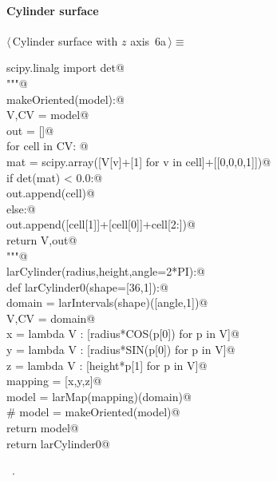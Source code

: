 \documentclass[11pt,oneside]{article}	%
\begin{document}
\paragraph{Cylinder surface}
\begin{flushleft} \small \label{scrap9}
\protect{}$\langle\,$Cylinder surface with $z$ axis\nobreak\ {\footnotesize 6a}$\,\rangle\equiv$
\vspace{-1ex}
\begin{list}{}{} \item
\mbox{}\verb@from scipy.linalg import det@\\
\mbox{}\verb@"""@\\
\mbox{}\verb@def makeOriented(model):@\\
\mbox{}\verb@   V,CV = model@\\
\mbox{}\verb@   out = []@\\
\mbox{}\verb@   for cell in CV: @\\
\mbox{}\verb@      mat = scipy.array([V[v]+[1] for v in cell]+[[0,0,0,1]])@\\
\mbox{}\verb@      if det(mat) < 0.0:@\\
\mbox{}\verb@         out.append(cell)@\\
\mbox{}\verb@      else:@\\
\mbox{}\verb@         out.append([cell[1]]+[cell[0]]+cell[2:])@\\
\mbox{}\verb@   return V,out@\\
\mbox{}\verb@"""@\\
\mbox{}\verb@def larCylinder(radius,height,angle=2*PI):@\\
\mbox{}\verb@   def larCylinder0(shape=[36,1]):@\\
\mbox{}\verb@      domain = larIntervals(shape)([angle,1])@\\
\mbox{}\verb@      V,CV = domain@\\
\mbox{}\verb@      x = lambda V : [radius*COS(p[0]) for p in V]@\\
\mbox{}\verb@      y = lambda V : [radius*SIN(p[0]) for p in V]@\\
\mbox{}\verb@      z = lambda V : [height*p[1] for p in V]@\\
\mbox{}\verb@      mapping = [x,y,z]@\\
\mbox{}\verb@      model = larMap(mapping)(domain)@\\
\mbox{}\verb@      # model = makeOriented(model)@\\
\mbox{}\verb@      return model@\\
\mbox{}\verb@   return larCylinder0@\\
\mbox{}\verb@@{\NWsep}
\end{list}
\vspace{-1ex}
\footnotesize\addtolength{\baselineskip}{-1ex}
\begin{list}{}{\setlength{\itemsep}{-\parsep}\setlength{\itemindent}{-\leftmargin}}
\item \NWtxtMacroRefIn\ .
\end{list}
\end{flushleft}
\end{document}
